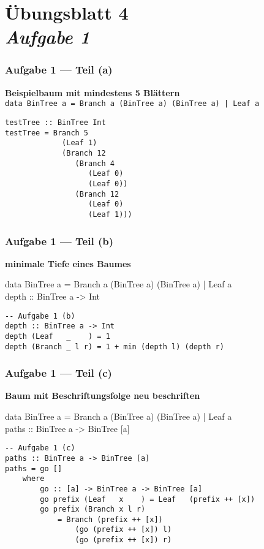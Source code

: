 \documentclass{beamer}
\begin{document}
\section{Übungsblatt 4 \\ \textit{\normalsize Aufgabe 1}}

\begin{frame}[fragile, t] \frametitle{Aufgabe 1 --- Teil (a)}
	\textbf{Beispielbaum mit mindestens 5 Blättern} \\
	\texttt{\small data BinTree a = Branch a (BinTree a) (BinTree a) | Leaf a}
	\pause
	\begin{lstlisting}
testTree :: BinTree Int
testTree = Branch 5
             (Leaf 1)
             (Branch 12
                (Branch 4
                   (Leaf 0)
                   (Leaf 0))
                (Branch 12
                   (Leaf 0)
                   (Leaf 1)))
	\end{lstlisting}
\end{frame}

\begin{frame}[fragile, t] \frametitle{Aufgabe 1 --- Teil (b)}
	\textbf{minimale Tiefe eines Baumes}
	
	\begin{ttfamily}
		{\small data BinTree a = Branch a (BinTree a) (BinTree a) | Leaf a} \\
		depth :: BinTree a -> Int
	\end{ttfamily}
	
	\bigskip \pause
	
	\begin{lstlisting}
-- Aufgabe 1 (b)
depth :: BinTree a -> Int
depth (Leaf   _    ) = 1
depth (Branch _ l r) = 1 + min (depth l) (depth r)
	\end{lstlisting}
\end{frame}


\begin{frame}[fragile, t] \frametitle{Aufgabe 1 --- Teil (c)}
	\textbf{Baum mit Beschriftungsfolge neu beschriften}
	
	\begin{ttfamily}
		{\small data BinTree a = Branch a (BinTree a) (BinTree a) | Leaf a} \\
		paths :: BinTree a -> BinTree [a]
	\end{ttfamily}
	
	\bigskip \pause
	
	\begin{lstlisting}
-- Aufgabe 1 (c)
paths :: BinTree a -> BinTree [a]
paths = go []
	where
		go :: [a] -> BinTree a -> BinTree [a]
		go prefix (Leaf   x    ) = Leaf   (prefix ++ [x])
		go prefix (Branch x l r) 
			= Branch (prefix ++ [x]) 
				(go (prefix ++ [x]) l) 
				(go (prefix ++ [x]) r)
	\end{lstlisting}
\end{frame}
\end{document}
